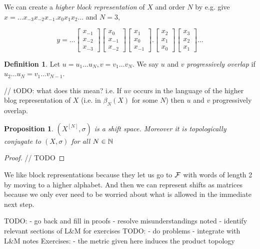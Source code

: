 \documentclass[11pt, reqno]{amsart}
\theoremstyle{plain}
\numberwithin{thm}{subsection}
\newtheorem{prop}[thm]{Proposition}
\theoremstyle{definition}
\newtheorem{defn}[thm]{Definition}
\begin{document}
We can create a \textit{higher block representation} of $X$ and order $N$ by e.g. give $x = \dots x_{-3}x_{-2}x_{-1}\textbf{.}x_0x_1x_2 \dots$ and $N = 3$, 

$$y = \dots \begin{bmatrix}x_{-1} \\ x_{-2} \\ x_{-3}\end{bmatrix}
\begin{bmatrix}x_{0} \\ x_{-1} \\ x_{-2}\end{bmatrix}
\begin{bmatrix}x_{1} \\ x_{0} \\ x_{-1}\end{bmatrix}
\textbf{.}
\begin{bmatrix}x_{2} \\ x_{1} \\ x_{0}\end{bmatrix}
\begin{bmatrix}x_{3} \\ x_{2} \\ x_{1}\end{bmatrix}
\dots$$

\begin{defn}
    Let $u = u_1\dots u_N, v = v_1\dots v_N$. We say $u$ and $v$ \textit{progressively overlap} if $u_2 \dots u_N = v_1 \dots v_{N-1}$.
\end{defn}

// tODO: what does this mean?
i.e. If $uv$ occurs in the language of the higher blog representation of $X$ (i.e. in $\beta_N(X)$ for some $N$) then $u$ and $v$ progressively overlap.

\begin{prop}
    $\left(X^{[N]}, \sigma\right)$ is a shift space. Moreover it is topologically conjugate to $\left(X, \sigma\right)$ for all $N \in \mathbb{N}$
\end{prop}

\begin{proof}
    // TODO
\end{proof}

We like block representations because they let us go to $\mathcal{F}$ with words of length 2 by moving to a higher alphabet. And then we can represent shifts as matrices because we only ever need to be worried about what is allowed in the immediate next step. 

TODO:
- go back and fill in proofs
- resolve misunderstandings noted 
- identify relevant sections of L\&M for exercises 
TODO: 
- do problems
- integrate with L\&M notes
Exercises:
- the metric given here induces the product topology

\printbibliography
\end{document}
